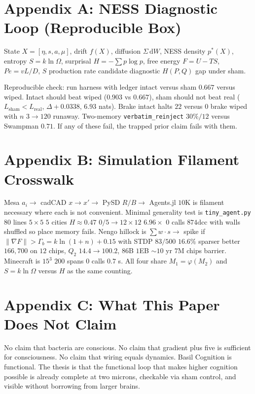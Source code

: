 \documentclass[11pt,a4paper]{article}
\begin{document}
\appendix
\section{Appendix A: NESS Diagnostic Loop (Reproducible Box)}
\label{app:ness}

State $X=[\eta,s,a,\mu]$, drift $f(X)$, diffusion $\Sigma\,\mathrm{d}W$, NESS density $p^*(X)$, entropy $S=k\ln\Omega$, surprisal $H=-\sum p\log p$, free energy $F=U-TS$, $Pe=vL/D$, $S$ production rate candidate diagnostic $H(P,Q)$ gap under sham.

Reproducible check: run harness with ledger intact versus sham $0.667$ versus wiped. Intact should beat wiped ($0.903$ vs $0.667$), sham should not beat real ($L_{\text{sham}}<L_{\text{real}}$, $\Delta+0.0338$, $6.93$ nats). Brake intact halts $22$ versus $0$ brake wiped with $n$ $3\to120$ runaway. Two-memory \texttt{verbatim\_reinject} $30\%/12$ versus Swampman $0.71$. If any of these fail, the trapped prior claim fails with them.

\section{Appendix B: Simulation Filament Crosswalk}
\label{app:crosswalk}

Mesa $a_i \to$ cadCAD $x\to x' \to$ PySD $R/B \to$ Agents.jl $10$K is filament necessary where each is not convenient. Minimal generality test is \texttt{tiny\_agent.py} $80$ lines $5\times5$ $5$ cities $H\approx0.47$ $0/5\to12\times12$ $6.96\times$ $0$ calls $874\text{dcc}$ with walls shuffled so place memory fails. Nengo hillock is $\sum w\cdot s \to$ spike if $\|\nabla F\|>\Gamma_b=k\ln(1+n)+0.15$ with STDP $83/500$ $16.6\%$ sparser better $166{,}700$ on $12$ chips, $Q_2$ $14.4\to100.2$, $86$B $1$EB $\sim10$ yr $7$M chips barrier. Minecraft is $15^3$ $200$ spans $0$ calls $0.7$ s. All four share $M_1=\varphi(M_2)$ and $S=k\ln\Omega$ versus $H$ as the same counting.

\section{Appendix C: What This Paper Does Not Claim}
\label{app:neg}

No claim that bacteria are conscious. No claim that gradient plus five is sufficient for consciousness. No claim that wiring equals dynamics. Basil Cognition is functional. The thesis is that the functional loop that makes higher cognition possible is already complete at two microns, checkable via sham control, and visible without borrowing from larger brains.
\end{document}
